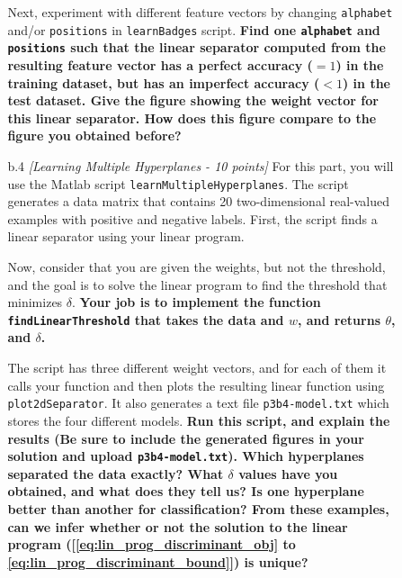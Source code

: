 \begin{enumerate}
\begin{enumerate}
\begin{enumerate}
      Next, experiment with different feature vectors by changing {\tt alphabet} and/or {\tt positions}
      in {\tt learnBadges} script.
      {\bf Find one {\tt alphabet} and {\tt positions} such that the linear separator computed
      from the resulting feature vector has a perfect accuracy ($=1$) in the training dataset,
      but has an imperfect accuracy ($<1$) in the test dataset.
      Give the figure showing the weight vector for this linear separator.
      How does this figure compare to the figure you obtained before?}

\item [b.4] {\em [Learning Multiple Hyperplanes - 10 points]}
      For this part, you will use the Matlab script {\tt learnMultipleHyperplanes}.
      The script generates a data matrix that contains 20 two-dimensional real-valued examples
      with positive and negative labels.
      First, the script finds a linear separator using your linear program.
      
      Now, consider that you are given the weights, but not the threshold,
      and the goal is to solve the linear program to find the threshold
      that minimizes $\delta$.
      {\bf Your job is to implement the function {\tt findLinearThreshold} that takes the data
      and $w$, and returns $\theta$, and $\delta$.}
      
      The script has three different weight vectors, and for each of them it calls your function
      and then plots the resulting linear function using {\tt 
      plot2dSeparator}. It also generates a text file {\tt p3b4-model.txt} 
      which stores the four different models. 
      {\bf Run this script, and explain the results (Be sure to include the 
      generated figures in your solution and upload {\tt p3b4-model.txt}).
      Which hyperplanes separated the data exactly? 
      What $\delta$ values have you obtained, and what does they tell us?
      Is one hyperplane better than another for classification?
      From these examples, can we infer whether or not
      the solution to the linear program
      ([\eqref{eq:lin_prog_discriminant_obj} to \eqref{eq:lin_prog_discriminant_bound}]) is unique?}

\end{enumerate}



\end{enumerate}
\end{enumerate}

